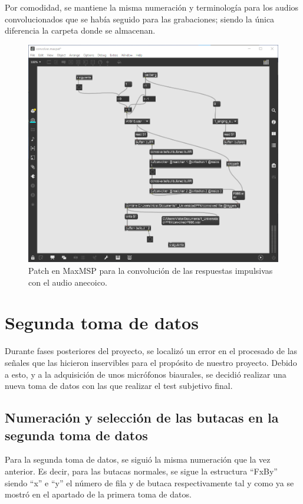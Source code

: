 \documentclass[11pt,a4paper,twoside]{book}
\begin{document}
                Por comodidad, se mantiene la misma numeración y terminología para los audios convolucionados que se había seguido para las grabaciones; siendo la única diferencia la carpeta donde se almacenan.
        
                \begin{figure}[H]
	                \includegraphics[scale=0.4]{../imagenes/convolver_max.png}
			        \centering
			        \caption{Patch en MaxMSP para la convolución de las respuestas impulsivas con el audio anecoico.}
			        \label{fig:convolver_max}
	            \end{figure}
        
                \newpage
            
    \section{Segunda toma de datos}
        Durante fases posteriores del proyecto, se localizó un error en el procesado de las señales que las hicieron inservibles para el propósito de nuestro proyecto. Debido a esto, y a la adquisición de unos micrófonos biaurales, se decidió realizar una nueva toma de datos con las que realizar el test subjetivo final.
        
        
       \subsection{Numeración y selección de las butacas en la segunda toma de datos}
            Para la segunda toma de datos, se siguió la misma numeración que la vez anterior. Es decir, para las butacas normales, se sigue la estructura ``FxBy'' siendo ``x'' e ``y'' el número de fila y de butaca respectivamente tal y como ya se mostró en el apartado de la primera toma de datos.
                
\end{document}

